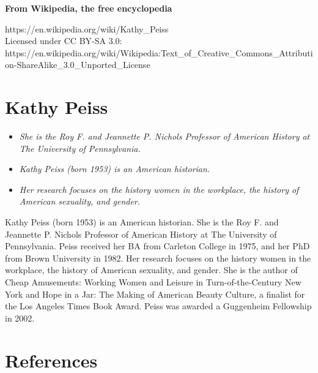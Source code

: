 \textbf{From Wikipedia, the free encyclopedia}

https://en.wikipedia.org/wiki/Kathy\_Peiss\\
Licensed under CC BY-SA 3.0:\\
https://en.wikipedia.org/wiki/Wikipedia:Text\_of\_Creative\_Commons\_Attribution-ShareAlike\_3.0\_Unported\_License

\section{Kathy Peiss}\label{kathy-peiss}

\begin{itemize}
\item
  \emph{She is the Roy F. and Jeannette P. Nichols Professor of American
  History at The University of Pennsylvania.}
\item
  \emph{Kathy Peiss (born 1953) is an American historian.}
\item
  \emph{Her research focuses on the history women in the workplace, the
  history of American sexuality, and gender.}
\end{itemize}

Kathy Peiss (born 1953) is an American historian. She is the Roy F. and
Jeannette P. Nichols Professor of American History at The University of
Pennsylvania. Peiss received her BA from Carleton College in 1975, and
her PhD from Brown University in 1982. Her research focuses on the
history women in the workplace, the history of American sexuality, and
gender. She is the author of Cheap Amusements: Working Women and Leisure
in Turn-of-the-Century New York and Hope in a Jar: The Making of
American Beauty Culture, a finalist for the Los Angeles Times Book
Award. Peiss was awarded a Guggenheim Fellowship in 2002.

\section{References}\label{references}
